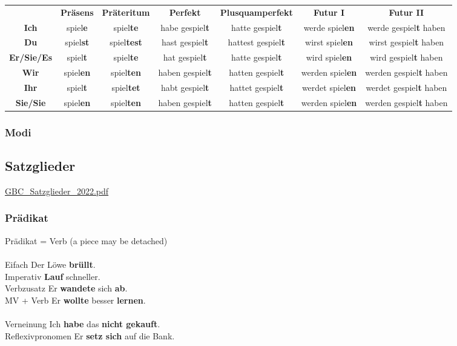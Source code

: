 \begin{center}
\begin{tabular}{|c|c|c|c|c|c|c|}
    \textbf{} & \textbf{Präsens} & \textbf{Präteritum} & \textbf{Perfekt} & \textbf{Plusquamperfekt} & \textbf{Futur I} & \textbf{Futur II} \\
    \textbf{Ich} & spiel\textbf{e} & spiel\textbf{te} & habe gespiel\textbf{t} & hatte gespiel\textbf{t} & werde spiel\textbf{en} & werde gespiel\textbf{t} haben \\
    \textbf{Du} & spiel\textbf{st} & spiel\textbf{test} & hast gespiel\textbf{t} & hattest gespiel\textbf{t} & wirst spiel\textbf{en} & wirst gespiel\textbf{t} haben \\
    \textbf{Er/Sie/Es} & spiel\textbf{t} & spiel\textbf{te} & hat gespiel\textbf{t} & hatte gespiel\textbf{t} & wird spiel\textbf{en} & wird gespiel\textbf{t} haben \\
    \textbf{Wir} & spiel\textbf{en} & spiel\textbf{ten} & haben gespiel\textbf{t} & hatten gespiel\textbf{t} & werden spiel\textbf{en} & werden gespiel\textbf{t} haben \\
    \textbf{Ihr} & spiel\textbf{t} & spiel\textbf{tet} & habt gespiel\textbf{t} & hattet gespiel\textbf{t} & werdet spiel\textbf{en} & werdet gespiel\textbf{t} haben \\
    \textbf{Sie/Sie} & spiel\textbf{en} & spiel\textbf{ten} & haben gespiel\textbf{t} & hatten gespiel\textbf{t} & werden spiel\textbf{en} & werden gespiel\textbf{t} haben \\
\end{tabular}
\end{center}

\subsubsection{Modi}

\subsection{Satzglieder}

\href{run:./includes/german/GBC/GBC_Satzglieder_2022.pdf}{GBC\_Satzglieder\_2022.pdf}

\subsubsection{Prädikat}

Prädikat = Verb (a piece may be detached)\\
\\
Eifach \arrow Der Löwe \textbf{brüllt}.\\
Imperativ \arrow \textbf{Lauf} schneller.\\
Verbzusatz \arrow Er \textbf{wandete} sich \textbf{ab}.\\
MV + Verb \arrow Er \textbf{wollte} besser \textbf{lernen}.\\
\\
Verneinung \arrow Ich \textbf{habe} das \textbf{nicht gekauft}.\\
Reflexivpronomen \arrow Er \textbf{setz sich} auf die Bank.\\


